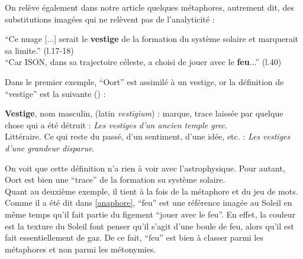 \documentclass[a4paper,10pt]{article}
\begin{document}
			On relève également dans notre article quelques métaphores, autrement dit, des substitutions imagées qui ne relèvent pas de l'analyticité :
			\begin{center}
				\footnotesize
				\begin{minipage}{0.7\textwidth}
					``Ce nuage [...] serait le \textbf{vestige} de la formation du système solaire et marquerait sa limite.'' (l.17-18) \\
					``Car ISON, dans sa trajectoire céleste, a choisi de jouer avec le \textbf{feu}...'' (l.40)
				\end{minipage}
			\end{center}
			Dans le premier exemple, ``Oort'' est assimilé à un vestige, or la définition de ``vestige'' est la suivante (\cite{vestige}) :
			\begin{center}
				\footnotesize
				\begin{minipage}{0.7\textwidth}
					\textbf{Vestige}, nom masculin, (latin \textit{vestigium}) : marque, trace laissée par quelque chose qui a été détruit : \textit{Les vestiges d'un ancien temple grec}.\\
					Littéraire. Ce qui reste du passé, d'un sentiment, d'une idée, etc. : \textit{Les vestiges d'une grandeur disparue}.
				\end{minipage}
			\end{center}
			On voit que cette définition n'a rien à voir avec l'astrophysique. Pour autant, Oort est bien une ``trace'' de la formation su système solaire.\\
			Quant au deuxième exemple, il tient à la fois de la métaphore et du jeu de mots. Comme il a été dit dans \ref{anaphore}, ``feu'' est une référence imagée au Soleil en même temps qu'il fait partie du figement ``jouer avec le feu''. En effet, la couleur est la texture du Soleil font penser qu'il s'agit d'une boule de feu, alors qu'il est fait essentiellement de gaz. De ce fait, ``feu'' est bien à classer parmi les métaphores et non parmi les métonymies.
\end{document}

